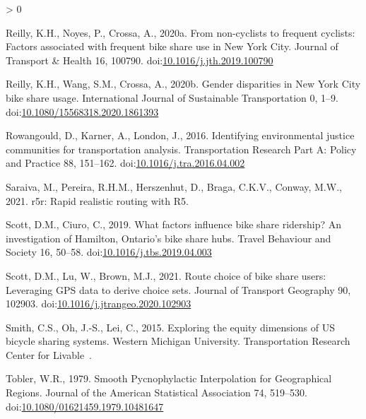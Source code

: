 \documentclass[]{elsarticle} %
\newlength{\cslhangindent}
\newenvironment{CSLReferences}[2] %
 {%
  \setlength{\parindent}{0pt}
  \ifodd #1 \everypar{\setlength{\hangindent}{\cslhangindent}}\ignorespaces\fi
  \ifnum #2 > 0
  \setlength{\parskip}{#2\baselineskip}
  \fi
 }%
 {}
\begin{document}
\begin{CSLReferences}{1}{0}
\leavevmode\hypertarget{ref-reillyNoncyclistsFrequentCyclists2020}{}%
Reilly, K.H., Noyes, P., Crossa, A., 2020a. From non-cyclists to
frequent cyclists: {Factors} associated with frequent bike share use in
{New York City}. Journal of Transport \& Health 16, 100790.
doi:\href{https://doi.org/10.1016/j.jth.2019.100790}{10.1016/j.jth.2019.100790}

\leavevmode\hypertarget{ref-reillyGenderDisparitiesNew2020}{}%
Reilly, K.H., Wang, S.M., Crossa, A., 2020b. Gender disparities in {New
York City} bike share usage. International Journal of Sustainable
Transportation 0, 1--9.
doi:\href{https://doi.org/10.1080/15568318.2020.1861393}{10.1080/15568318.2020.1861393}

\leavevmode\hypertarget{ref-rowangouldIdentifyingEnvironmentalJustice2016}{}%
Rowangould, D., Karner, A., London, J., 2016. Identifying environmental
justice communities for transportation analysis. Transportation Research
Part A: Policy and Practice 88, 151--162.
doi:\href{https://doi.org/10.1016/j.tra.2016.04.002}{10.1016/j.tra.2016.04.002}

\leavevmode\hypertarget{ref-R-r5r}{}%
Saraiva, M., Pereira, R.H.M., Herszenhut, D., Braga, C.K.V., Conway,
M.W., 2021. r5r: Rapid realistic routing with R5.

\leavevmode\hypertarget{ref-scottWhatFactorsInfluence2019}{}%
Scott, D.M., Ciuro, C., 2019. What factors influence bike share
ridership? {An} investigation of {Hamilton}, {Ontario}'s bike share
hubs. Travel Behaviour and Society 16, 50--58.
doi:\href{https://doi.org/10.1016/j.tbs.2019.04.003}{10.1016/j.tbs.2019.04.003}

\leavevmode\hypertarget{ref-scottRouteChoiceBike2021}{}%
Scott, D.M., Lu, W., Brown, M.J., 2021. Route choice of bike share
users: Leveraging GPS data to derive choice sets. Journal of Transport
Geography 90, 102903.
doi:\href{https://doi.org/10.1016/j.jtrangeo.2020.102903}{10.1016/j.jtrangeo.2020.102903}

\leavevmode\hypertarget{ref-smith2015exploring}{}%
Smith, C.S., Oh, J.-S., Lei, C., 2015. Exploring the equity dimensions
of US bicycle sharing systems. Western Michigan University.
Transportation Research Center for Livable~.

\leavevmode\hypertarget{ref-toblerSmoothPycnophylacticInterpolation1979}{}%
Tobler, W.R., 1979. Smooth {Pycnophylactic Interpolation} for
{Geographical Regions}. Journal of the American Statistical Association
74, 519--530.
doi:\href{https://doi.org/10.1080/01621459.1979.10481647}{10.1080/01621459.1979.10481647}


\end{CSLReferences}
\end{document}
